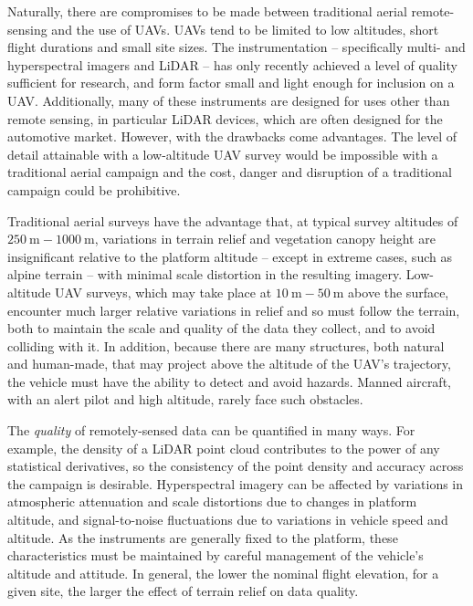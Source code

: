 Naturally, there are compromises to be made between traditional aerial remote-sensing and the use of UAVs. UAVs tend to be limited to low altitudes, short flight durations and small site sizes. The instrumentation -- specifically multi- and hyperspectral imagers and LiDAR -- has only recently achieved a level of quality sufficient for research, and form factor small and light enough for inclusion on a UAV. Additionally, many of these instruments are designed for uses other than remote sensing, in particular LiDAR devices, which are often designed for the automotive market. However, with the drawbacks come advantages. The level of detail attainable with a low-altitude UAV survey would be impossible with a traditional aerial campaign and the cost, danger and disruption of a traditional campaign could be prohibitive.

Traditional aerial surveys have the advantage that, at typical survey altitudes of $\SI{250}\m-\SI{1000}\m$, variations in terrain relief and vegetation canopy height are insignificant relative to the platform altitude -- except in extreme cases, such as alpine terrain -- with minimal scale distortion in the resulting imagery. Low-altitude UAV surveys, which may take place at $\SI{10}\m-\SI{50}\m$ above the surface, encounter much larger relative variations in relief and so must follow the terrain, both to maintain the scale and quality of the data they collect, and to avoid colliding with it. In addition, because there are many structures, both natural and human-made, that may project above the altitude of the UAV's trajectory, the vehicle must have the ability to detect and avoid hazards. Manned aircraft, with an alert pilot and high altitude, rarely face such obstacles. 

The \emph{quality} of remotely-sensed data can be quantified in many ways. For example, the density of a LiDAR point cloud contributes to the power of any statistical derivatives, so the consistency of the point density and accuracy across the campaign is desirable. Hyperspectral imagery can be affected by variations in atmospheric attenuation and scale distortions due to changes in platform altitude, and signal-to-noise fluctuations due to variations in vehicle speed and altitude. As the instruments are generally fixed to the platform, these characteristics must be maintained by careful management of the vehicle's altitude and attitude. In general, the lower the nominal flight elevation, for a given site, the larger the effect of terrain relief on data quality.

